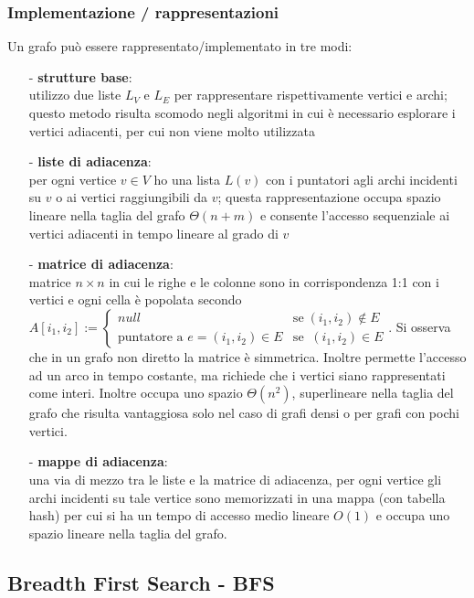 \documentclass[a4paper]{article}
\begin{document}
\subsubsection*{Implementazione / rappresentazioni}
Un grafo può essere rappresentato/implementato in tre modi:
\begin{itemize}[topsep=3pt, itemsep=0pt]
	\item[-] \textbf{strutture base}: \\
	utilizzo due liste \(L_V\) e \(L_E\) per rappresentare rispettivamente vertici e archi; questo metodo risulta scomodo negli
	algoritmi in cui è necessario esplorare i vertici adiacenti, per cui non viene molto utilizzata
	\item[-] \textbf{liste di adiacenza}: \\
	per ogni vertice \(v \in V\) ho una lista \(L(v)\) con i puntatori agli archi incidenti su \(v\) o ai vertici raggiungibili
	da \(v\); questa rappresentazione occupa spazio lineare nella taglia del grafo \(\Theta(n+m)\) e consente l'accesso sequenziale
	ai vertici adiacenti in tempo lineare al grado di \(v\)
	\item[-] \textbf{matrice di adiacenza}: \\
	matrice \(n \times n\) in cui le righe e le colonne sono in corrispondenza 1:1 con i vertici e ogni cella è popolata secondo
	\(A[i_1,i_2] := \begin{cases} null & \text{se} \; (i_1, i_2) \notin E \\ \text{puntatore a } e = (i_1, i_2) \in E & \text{se}\; \; (i_1, i_2) \in E \end{cases}\).
	Si osserva che in un grafo non diretto la matrice è simmetrica. Inoltre permette l'accesso ad un arco in tempo costante, ma
	richiede che i vertici siano rappresentati come interi. Inoltre occupa uno spazio \(\Theta(n^2)\), superlineare nella taglia
	del grafo che risulta vantaggiosa solo nel caso di grafi densi o per grafi con pochi vertici.
	\item[-] \textbf{mappe di adiacenza}: \\
	una via di mezzo tra le liste e la matrice di adiacenza, per ogni vertice gli archi incidenti su tale vertice sono memorizzati
	in una mappa (con tabella hash) per cui si ha un tempo di accesso medio lineare \(O(1)\) e occupa uno spazio lineare nella
	taglia del grafo.
\end{itemize}

\newpage

\subsection{Breadth First Search - BFS}
\end{document}
